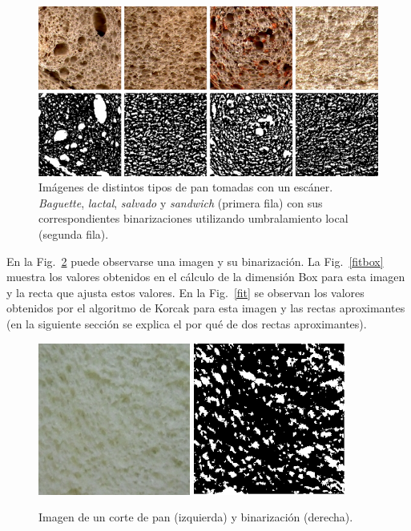 \begin{figure}[h!]
\centering
\includegraphics[width=13cm]{figures/binarizaciones}
\caption[Imágenes de distintos tipos de pan tomadas con un escáner.]{Imágenes de distintos tipos de pan tomadas con un escáner. {\em Baguette}, {\em lactal}, {\em salvado} y {\em sandwich} (primera fila) con sus correspondientes binarizaciones utilizando umbralamiento local (segunda fila).}
\label{fig:bread}
\end{figure}


En la Fig.~\ref{bin} puede observarse una imagen  y su binarizaci\'on.
La Fig.~\ref{fitbox} muestra los valores obtenidos en el c\'alculo de la dimensi\'on Box para esta imagen y la recta que ajusta estos valores. 
En la Fig.~\ref{fit} se observan los valores obtenidos por el algoritmo de Korcak para esta imagen y las rectas aproximantes (en la siguiente secci\'on se explica el por qu\'e de dos rectas aproximantes).

\begin{figure}
\centering
\includegraphics[width=5cm]{figures/lactal}
\includegraphics[width=5cm]{figures/lactalBin}
\caption{Imagen de un corte de pan (izquierda) y binarización (derecha).}
\label{bin}
\end{figure}



